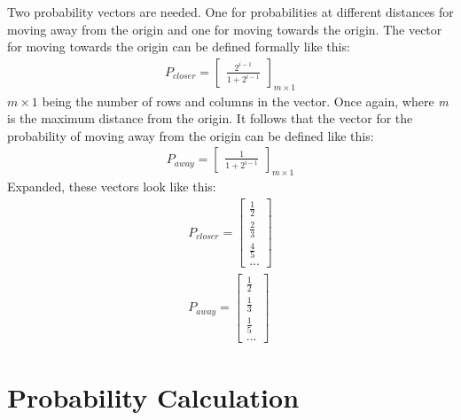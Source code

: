 \documentclass[letterpaper, 12pt]{report}
\begin{document}
Two probability vectors are needed. One for probabilities at different
distances for moving away from the origin and one for moving towards the
origin. The vector for moving towards the origin can be defined formally like
this:
\begin{align*}
	P_{closer}=
	\begin{bmatrix}
		\frac{2^{i-1}}{1+2^{i-1}}
	\end{bmatrix}
	_{m{\times}1}
\end{align*}
$m{\times}1$ being the number of rows and columns in the vector. Once again, where \textit{m} is the maximum distance from the origin. It follows that the vector for the probability of moving away from the origin can be defined like this:
\begin{align*}
	P_{away}=
	\begin{bmatrix}
		\frac{1}{1+2^{i-1}}
	\end{bmatrix}
	_{m{\times}1}
\end{align*}
Expanded, these vectors look like this:
\begin{align*}
	P_{closer}=
	\begin{bmatrix}
		\frac{1}{2} \\ \frac{2}{3} \\ \frac{4}{5} \\ ...
	\end{bmatrix}
	\\
	P_{away}=
	\begin{bmatrix}
		\frac{1}{2} \\ \frac{1}{3} \\ \frac{1}{5} \\ ...
	\end{bmatrix}
\end{align*}

\section{Probability Calculation}
\end{document}
